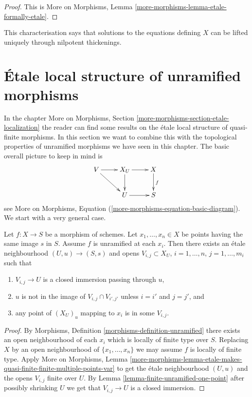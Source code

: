 \begin{proof}
This is
More on Morphisms, Lemma \ref{more-morphisms-lemma-etale-formally-etale}.
\end{proof}

\noindent
This characterisation says that solutions to the equations defining $X$ can
be lifted uniquely through nilpotent thickenings.



\section{\'Etale local structure of unramified morphisms}
\label{section-unramified-etale-local}

\noindent
In the chapter
More on Morphisms, Section \ref{more-morphisms-section-etale-localization}
the reader can find some results on the \'etale local structure of
quasi-finite morphisms. In this section we want to combine this
with the topological properties of unramified morphisms we have seen
in this chapter. The basic overall picture to keep in mind is
$$
\xymatrix{
V \ar[r] \ar[dr] & X_U \ar[d] \ar[r] & X \ar[d]^f \\
& U \ar[r] & S
}
$$
see
More on Morphisms, Equation (\ref{more-morphisms-equation-basic-diagram}).
We start with a very general case.

\begin{lemma}
\label{lemma-unramified-etale-local}
Let $f : X \to S$ be a morphism of schemes.
Let $x_1, \ldots, x_n \in X$ be points having the same image $s$ in $S$.
Assume $f$ is unramified at each $x_i$.
Then there exists an \'etale neighbourhood $(U, u) \to (S, s)$
and opens $V_{i, j} \subset X_U$, $i = 1, \ldots, n$, $j = 1, \ldots, m_i$
such that
\begin{enumerate}
\item $V_{i, j} \to U$ is a closed immersion passing through $u$,
\item $u$ is not in the image of $V_{i, j} \cap V_{i', j'}$ unless
$i = i'$ and $j = j'$, and
\item any point of $(X_U)_u$ mapping to $x_i$ is in some $V_{i, j}$.
\end{enumerate}
\end{lemma}

\begin{proof}
By
Morphisms, Definition \ref{morphisms-definition-unramified}
there exists an open neighbourhood of each $x_i$ which is locally of finite
type over $S$. Replacing $X$ by an open neighbourhood of $\{x_1, \ldots, x_n\}$
we may assume $f$ is locally of finite type. Apply
More on Morphisms, Lemma
\ref{more-morphisms-lemma-etale-makes-quasi-finite-finite-multiple-points-var}
to get the \'etale neighbourhood $(U, u)$ and the opens $V_{i,j}$ finite over
$U$. By
Lemma \ref{lemma-finite-unramified-one-point}
after possibly shrinking $U$ we get that $V_{i, j} \to U$ is a closed
immersion.
\end{proof}


